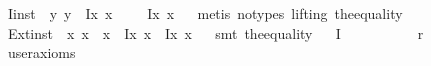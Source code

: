 \begin{isabellebody}
\ I{}{\isacharunderscore}inst\ {\isacharcolon}\ {\isachardoublequoteopen}\isactrlbold {\isasymnot}{\isacharparenleft}\isactrlbold {\isasymexists}y{\isachardot}\ y\ \isactrlbold {\isacharequal}\ {\isacharparenleft}\isactrlbold Ix{\isachardot}\ {\isasymPhi}{\isacharparenleft}x{\isacharparenright}{\isacharparenright}{\isacharparenright}\ \isactrlbold {\isasymrightarrow}\ \ {\isacharparenleft}{\isasymOtimes}\ \isactrlbold {\isacharequal}\ {\isacharparenleft}\isactrlbold Ix{\isachardot}\ {\isasymPhi}{\isacharparenleft}x{\isacharparenright}{\isacharparenright}{\isacharparenright}{\isachardoublequoteclose}%
\isadelimproof
\ %
\endisadelimproof
%
\isatagproof
{}\isamarkupfalse%
\ {\isacharparenleft}metis\ {\isacharparenleft}no{\isacharunderscore}types{\isacharcomma}\ lifting{\isacharparenright}\ the{\isacharunderscore}equality{\isacharparenright}%
\endisatagproof
{\isafoldproof}%
%
\isadelimproof
%
\endisadelimproof
\isanewline
\isanewline
\ \isanewline
{}\isamarkupfalse%
\ Ext{\isacharunderscore}inst\ {\isacharcolon}\ {\isachardoublequoteopen}{\isacharparenleft}\isactrlbold {\isasymforall}x{\isachardot}\ {\isasymPhi}{\isacharparenleft}x{\isacharparenright}\ \isactrlbold {\isasymleftrightarrow}\ {\isasymPsi}{\isacharparenleft}x{\isacharparenright}{\isacharparenright}\ \isactrlbold {\isasymrightarrow}\ {\isacharparenleft}{\isacharparenleft}\isactrlbold Ix{\isachardot}\ {\isasymPhi}{\isacharparenleft}x{\isacharparenright}{\isacharparenright}\ \isactrlbold {\isacharequal}\ {\isacharparenleft}\isactrlbold Ix{\isachardot}\ {\isasymPsi}{\isacharparenleft}x{\isacharparenright}{\isacharparenright}{\isacharparenright}{\isachardoublequoteclose}%
\isadelimproof
\ %
\endisadelimproof
%
\isatagproof
{}\isamarkupfalse%
\ {\isacharparenleft}smt\ the{}{\isacharunderscore}equality{\isacharparenright}%
\endisatagproof
{\isafoldproof}%
%
\isadelimproof
%
\endisadelimproof
\isanewline
\isanewline
\isanewline
\ \isanewline
{}\isamarkupfalse%
\ I{}\ {\isacharcolon}\ {\isachardoublequoteopen}{\isacharparenleft}{\isasymOtimes}\ \isactrlbold {\isacharequal}\ {\isasymalpha}\ \isactrlbold {\isasymor}\ {\isasymOtimes}\ \isactrlbold {\isacharequal}\ {\isasymbeta}{\isacharparenright}\ \isactrlbold {\isasymrightarrow}\ \isactrlbold {\isasymnot}{\isacharparenleft}{\isasymalpha}\ \isactrlbold r\ {\isasymbeta}{\isacharparenright}{\isachardoublequoteclose}\ \isamarkupfalse%
\ {\isacharbrackleft}user{\isacharunderscore}axioms{\isacharbrackright}%
\isadelimproof
\ %
\endisadelimproof
%

\end{isabellebody}
